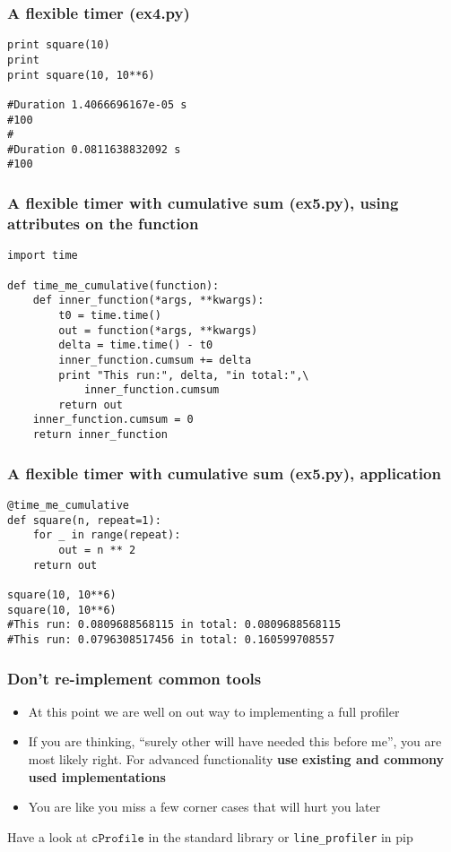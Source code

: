 \documentclass{beamer}
\begin{document}
\begin{frame}[fragile]
  \frametitle{A flexible timer (ex4.py)}
\begin{verbatim}
print square(10)
print
print square(10, 10**6)

#Duration 1.4066696167e-05 s
#100
#
#Duration 0.0811638832092 s
#100
\end{verbatim}
\end{frame}

\begin{frame}[fragile]
  \frametitle{A flexible timer with cumulative sum (ex5.py), using attributes
    on the function}
\begin{verbatim}
import time

def time_me_cumulative(function):
    def inner_function(*args, **kwargs):
        t0 = time.time()
        out = function(*args, **kwargs)
        delta = time.time() - t0
        inner_function.cumsum += delta
        print "This run:", delta, "in total:",\
            inner_function.cumsum
        return out
    inner_function.cumsum = 0
    return inner_function
\end{verbatim}
\end{frame}

\begin{frame}[fragile]
  \frametitle{A flexible timer with cumulative sum (ex5.py), application}
\begin{verbatim}
@time_me_cumulative
def square(n, repeat=1):
    for _ in range(repeat):
        out = n ** 2
    return out

square(10, 10**6)
square(10, 10**6)
#This run: 0.0809688568115 in total: 0.0809688568115
#This run: 0.0796308517456 in total: 0.160599708557
\end{verbatim}
\end{frame}

\begin{frame}
  \frametitle{Don't re-implement common tools}
  \begin{itemize}
  \item At this point we are well on out way to implementing a full profiler
  \item If you are thinking, ``surely other will have needed this before me'',
    you are most likely right. For advanced functionality \textbf{use existing and commony used implementations}
  \item You are like you miss a few corner cases that will hurt you later
  \end{itemize}
  \begin{block}{}
    Have a look at $\texttt{cProfile}$ in the standard library or
    \texttt{line\_profiler} in pip
  \end{block}
\end{frame}
\end{document}
